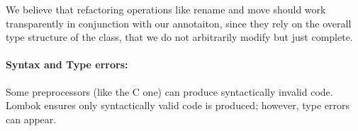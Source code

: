 We believe that refactoring operations like rename and move
should work transparently in conjunction with our annotaiton, since they rely on
the overall type structure of the class, that we do not arbitrarily modify but just complete.






\paragraph{Syntax and Type errors:}
Some preprocessors (like the C one) can produce syntactically invalid code.
Lombok ensures only syntactically valid code is produced; however, type errors can appear.

